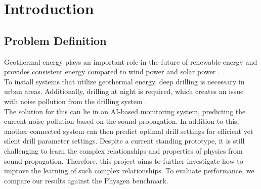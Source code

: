 \chapter{Introduction}
\label{cha:intro}
	
	
	
	\section{Problem Definition}
	\label{sec:intro-high_project}
		Geothermal energy plays an important role in the future of renewable energy and provides consistent energy compared to wind power and solar power \cite{geothermal_energy}\cite{herrenknecht_flyer}.\\
		To install systems that utilize geothermal energy, deep drilling is necessary in urban areas. Additionally, drilling at night is required, which creates an issue with noise pollution from the drilling system \cite{geothermal_energy}.\\
		The solution for this can lie in an AI-based monitoring system, predicting the current noise pollution based on the sound propagation. In addition to this, another connected system can then predict optimal drill settings for efficient yet silent drill parameter settings. Despite a current standing prototype, it is still challenging to learn the complex relationships and properties of physics from sound propagation. Therefore, this project aims to further investigate how to improve the learning of such complex relationships. To evaluate performance, we compare our results against the Physgen benchmark.
	
	
	
